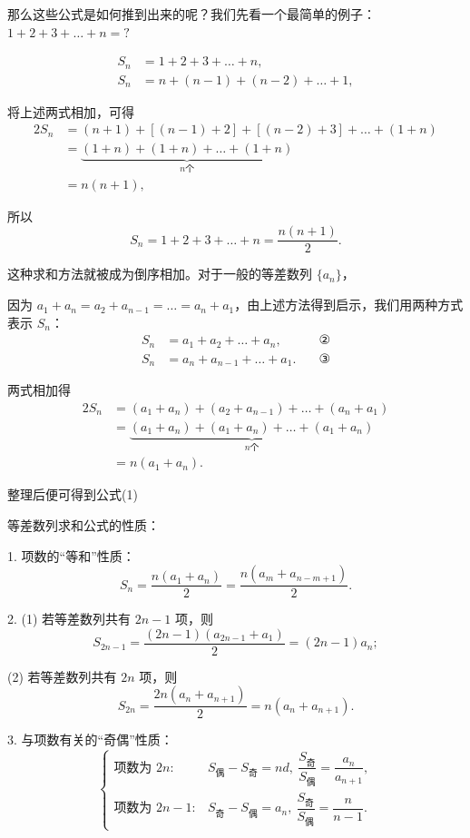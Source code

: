 \documentclass{article}
\begin{document}
那么这些公式是如何推到出来的呢？我们先看一个最简单的例子：$1 + 2 + 3 + \dots + n=?$

\[
\begin{aligned}
S_n &= 1 + 2 + 3 + \dots + n, \\
S_n &= n + (n-1) + (n-2) + \dots + 1,
\end{aligned}
\]

将上述两式相加，可得
\[
\begin{aligned}
2S_n &= (n+1) + [(n-1)+2] + [(n-2)+3] + \dots + (1+n) \\
&= \underbrace{(1+n)+(1+n)+\dots+(1+n)}_{n\text{个}} \\
&= n(n+1),
\end{aligned}
\]

所以
\[
S_n = 1 + 2 + 3 + \dots + n = \frac{n(n+1)}{2}.
\]

这种求和方法就被成为倒序相加。对于一般的等差数列 \(\{a_n\}\)，

因为 \(a_1 + a_n = a_2 + a_{n-1} = \dots = a_n + a_1\)，由上述方法得到启示，我们用两种方式表示 \(S_n\)：
\[
\begin{aligned}
S_n &= a_1 + a_2 + \dots + a_n, \quad &\text{②} \\
S_n &= a_n + a_{n-1} + \dots + a_1. \quad &\text{③}
\end{aligned}
\]

两式相加得
\[
\begin{aligned}
2S_n &= (a_1 + a_n) + (a_2 + a_{n-1}) + \dots + (a_n + a_1) \\
&= \underbrace{(a_1 + a_n) + (a_1 + a_n) + \dots + (a_1 + a_n)}_{n\text{个}} \\
&= n(a_1 + a_n).
\end{aligned}
\]

整理后便可得到公式(1)

\newpage

等差数列求和公式的性质：

1. 项数的“等和”性质：
\[
S_n = \frac{n(a_1 + a_n)}{2} = \frac{n(a_m + a_{n-m+1})}{2}.
\]

2. (1) 若等差数列共有 \(2n-1\) 项，则
\[
S_{2n-1} = \frac{(2n-1)(a_{2n-1} + a_1)}{2} = (2n-1)a_n;
\]

(2) 若等差数列共有 \(2n\) 项，则
\[
S_{2n} = \frac{2n(a_n + a_{n+1})}{2} = n(a_n + a_{n+1}).
\]

3. 与项数有关的“奇偶”性质：
\[
\begin{cases}
\text{项数为 } 2n: & S_{\text{偶}} - S_{\text{奇}} = nd,\ \dfrac{S_{\text{奇}}}{S_{\text{偶}}} = \dfrac{a_n}{a_{n+1}}, \\
\text{项数为 } 2n-1: & S_{\text{奇}} - S_{\text{偶}} = a_n,\ \dfrac{S_{\text{奇}}}{S_{\text{偶}}} = \dfrac{n}{n-1}.
\end{cases}
\]
\end{document}
